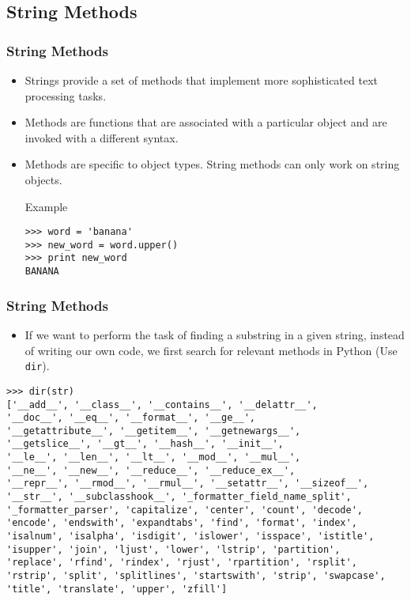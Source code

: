\documentclass{beamer}
\newcommand{\beforeverb}{\footnotesize}
\begin{document}
\subsection[String Methods]{String Methods}
\begin{frame}[fragile]
\frametitle{String Methods}
\begin{itemize}
\item Strings provide a set of \alert{methods} that implement more sophisticated text processing tasks.
\item Methods are functions that are associated with a particular \alert{object} and are \alert{invoked} with  a different syntax. 
\item Methods are specific to  \alert{object types}. String methods can only work on string objects.
\begin{block}{Example}
\beforeverb
\begin{verbatim}
>>> word = 'banana'
>>> new_word = word.upper()
>>> print new_word
BANANA
\end{verbatim}%
\end{block}


\end{itemize}
\end{frame}
\begin{frame}[fragile]
\frametitle{String Methods}
\begin{itemize}
\item If we want to perform the task of finding a substring in a given string, instead of writing our own code, we first search for relevant methods in Python (Use {\tt dir}). 
\end{itemize}
\begin{block}{}
\tiny
\begin{verbatim}
>>> dir(str)
['__add__', '__class__', '__contains__', '__delattr__', 
'__doc__', '__eq__', '__format__', '__ge__', 
'__getattribute__', '__getitem__', '__getnewargs__',
'__getslice__', '__gt__', '__hash__', '__init__',
'__le__', '__len__', '__lt__', '__mod__', '__mul__',
'__ne__', '__new__', '__reduce__', '__reduce_ex__', 
'__repr__', '__rmod__', '__rmul__', '__setattr__', '__sizeof__', 
'__str__', '__subclasshook__', '_formatter_field_name_split', 
'_formatter_parser', 'capitalize', 'center', 'count', 'decode',
'encode', 'endswith', 'expandtabs', 'find', 'format', 'index', 
'isalnum', 'isalpha', 'isdigit', 'islower', 'isspace', 'istitle', 
'isupper', 'join', 'ljust', 'lower', 'lstrip', 'partition', 
'replace', 'rfind', 'rindex', 'rjust', 'rpartition', 'rsplit',
'rstrip', 'split', 'splitlines', 'startswith', 'strip', 'swapcase',
'title', 'translate', 'upper', 'zfill']
\end{verbatim}
\end{block}
\end{frame}
\end{document}
